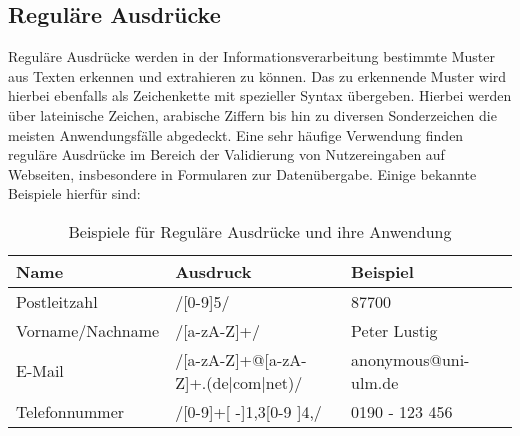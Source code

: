 \subsection{Reguläre Ausdrücke	}
Reguläre Ausdrücke werden in der Informationsverarbeitung bestimmte Muster aus Texten erkennen und extrahieren zu können. Das zu erkennende Muster wird hierbei ebenfalls als Zeichenkette mit spezieller Syntax übergeben. Hierbei werden über lateinische Zeichen, arabische Ziffern bis hin zu diversen Sonderzeichen die meisten Anwendungsfälle abgedeckt.
Eine sehr häufige Verwendung finden reguläre Ausdrücke im Bereich der Validierung von Nutzereingaben auf Webseiten, insbesondere in Formularen zur Datenübergabe. Einige bekannte Beispiele hierfür sind:
\newline
\begin{table}
\begin{tabular}{llll}
\hline
Name & Ausdruck & Beispiel \\
\hline
Postleitzahl & /[0-9]{5}/ & 87700 \\
Vorname/Nachname & /[a-zA-Z]+/ & Peter Lustig \\
E-Mail & /[a-zA-Z]+@[a-zA-Z]+.(de|com|net)/ & anonymous@uni-ulm.de \\
Telefonnummer & /[0-9]+[ -]{1,3}[0-9 ]{4,}/ & 0190 - 123 456 \\
\hline
\end{tabular}
\caption{Beispiele für Reguläre Ausdrücke und ihre Anwendung}
\end{table}

